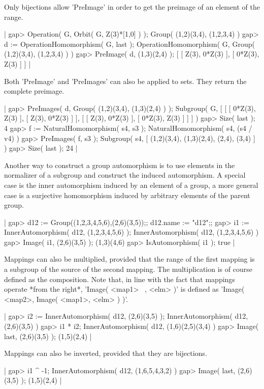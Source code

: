 Only  bijections  allow 'PreImage'  in order  to  get the preimage  of an
element of the range.

|    gap> Operation( G, Orbit( G, Z(3)*[1,0] ) );
    Group( (1,2)(3,4), (1,2,3,4) )
    gap> d := OperationHomomorphism( G, last );
    OperationHomomorphism( G, Group( (1,2)(3,4), (1,2,3,4) ) )
    gap> PreImage( d, (1,3)(2,4) );
    [ [ Z(3), 0*Z(3) ], [ 0*Z(3), Z(3) ] ] |

Both 'PreImage' and 'PreImages' can also be applied to sets.  They return
the complete preimage.

|    gap> PreImages( d, Group( (1,2)(3,4), (1,3)(2,4) ) );
    Subgroup( G, [ [ [ 0*Z(3), Z(3) ], [ Z(3), 0*Z(3) ] ],
      [ [ Z(3), 0*Z(3) ], [ 0*Z(3), Z(3) ] ] ] )
    gap> Size( last );
    4
    gap> f := NaturalHomomorphism( s4, s3 );
    NaturalHomomorphism( s4, (s4 / v4) )
    gap> PreImages( f, s3 );
    Subgroup( s4, [ (1,2)(3,4), (1,3)(2,4), (2,4), (3,4) ] )
    gap> Size( last );
    24 |

Another  way to construct a group  automorphism is to use elements in the
normalizer  of  a subgroup and construct  the  induced  automorphism.   A
special  case is the inner automorphism induced by an element of a group,
a  more general  case is a surjective  homomorphism induced by  arbitrary
elements of the parent group.

|    gap> d12 := Group((1,2,3,4,5,6),(2,6)(3,5));;  d12.name := "d12";;
    gap> i1 := InnerAutomorphism( d12, (1,2,3,4,5,6) );
    InnerAutomorphism( d12, (1,2,3,4,5,6) )
    gap> Image( i1, (2,6)(3,5) );
    (1,3)(4,6)
    gap> IsAutomorphism( i1 );
    true |

Mappings can also  be  multiplied, provided  that the range  of the first
mapping is  a  subgroup  of  the  source  of  the  second  mapping.   The
multiplication  is  of course defined as the  composition.  Note that, in
line with the fact that mappings operate *from the right*, 'Image( <map1>
\*\ <map2>, <elm> )' is defined as 'Image( <map2>, Image( <map1>, <elm> )
)'.

|    gap> i2 := InnerAutomorphism( d12, (2,6)(3,5) );
    InnerAutomorphism( d12, (2,6)(3,5) )
    gap> i1 * i2;
    InnerAutomorphism( d12, (1,6)(2,5)(3,4) )
    gap> Image( last, (2,6)(3,5) );
    (1,5)(2,4) |

Mappings can also be inverted, provided that they are bijections.

|    gap> i1 ^ -1;
    InnerAutomorphism( d12, (1,6,5,4,3,2) )
    gap> Image( last, (2,6)(3,5) );
    (1,5)(2,4) |

